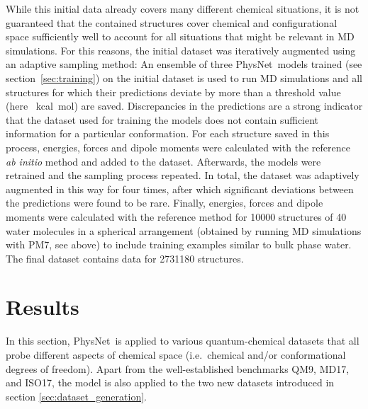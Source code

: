 \documentclass[12pt]{article}
\newcommand{\nn}{PhysNet}
\begin{document}
While this initial data already covers many different chemical
situations, it is not guaranteed that the contained structures cover
chemical and configurational space sufficiently well to account for
all situations that might be relevant in MD simulations. For this
reasons, the initial dataset was iteratively augmented using an
adaptive sampling
method:\cite{behler2014representing,behler2015constructing} An
ensemble\cite{breiman1996bagging} of three \nn\ models trained (see
section~\ref{sec:training}) on the initial dataset is used to run MD
simulations and all structures for which their predictions deviate by
more than a threshold value (here ~kcal~mol) are
saved. Discrepancies in the predictions are a strong indicator that
the dataset used for training the models does not contain sufficient
information for a particular
conformation.\cite{behler2014representing,behler2015constructing} For
each structure saved in this process, energies, forces and dipole
moments were calculated with the reference \textit{ab initio} method
and added to the dataset. Afterwards, the models were retrained and
the sampling process repeated. In total, the dataset was adaptively
augmented in this way for four times, after which significant
deviations between the predictions were found to be rare. Finally,
energies, forces and dipole moments were calculated with the reference
method for \num{10000} structures of \num{40} water molecules in a
spherical arrangement (obtained by running MD simulations with PM7,
see above) to include training examples similar to bulk phase
water. The final dataset contains data for \num{2731180} structures.

\section{Results}
\label{sec:results}
In this section, \nn\ is applied to various quantum-chemical datasets
that all probe different aspects of chemical space (i.e.\ chemical
and/or conformational degrees of freedom). Apart from the
well-established benchmarks QM9,\cite{ramakrishnan2014quantum}
MD17,\cite{chmiela2017machine} and ISO17,\cite{schutt2017schnet} the
model is also applied to the two new datasets introduced in section
\ref{sec:dataset_generation}.
\end{document}
